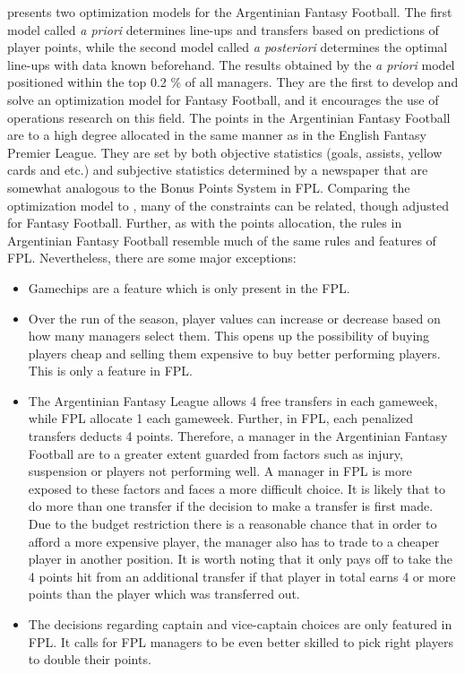 \newpar

\cite{Bonomo} presents two optimization models for the Argentinian Fantasy Football. The first model called \textit{a priori} determines line-ups and transfers based on predictions of player points, while the second model called \textit{a posteriori} determines the optimal line-ups with data known beforehand. The results obtained by the \textit{a priori} model positioned within the top 0.2 \% of all managers. They are the first to develop and solve an optimization model for Fantasy Football, and it encourages the use of operations research on this field. The points in the Argentinian Fantasy Football are to a high degree allocated in the same manner as in the English Fantasy Premier League. They are set by both objective statistics (goals, assists, yellow cards and etc.) and subjective statistics determined by a newspaper that are somewhat analogous to the Bonus Points System in FPL. Comparing the optimization model to \cite{Mathsports}, many of the constraints can be related, though adjusted for Fantasy Football. Further, as with the points allocation, the rules in Argentinian Fantasy Football resemble much of the same rules and features of FPL. Nevertheless, there are some major exceptions: 


\begin{itemize}
    \item Gamechips are a feature which is only present in the FPL.  
    \item Over the run of the season, player values can increase or decrease based on how many managers select them. This opens up the possibility of buying players cheap and selling them expensive to buy better performing players. This is only a feature in FPL.
    \item The Argentinian Fantasy League allows 4 free transfers in each gameweek, while FPL allocate 1 each gameweek. Further, in FPL, each penalized transfers deducts 4 points. Therefore, a manager in the Argentinian Fantasy Football are to a greater extent guarded from factors such as injury, suspension or players not performing well. A manager in FPL is more exposed to these factors and faces a more difficult choice. It is likely that to do more than one transfer if the decision to make a transfer is first made. Due to the budget restriction there is a reasonable chance that in order to afford a more expensive player, the manager also has to trade to a cheaper player in another position. It is worth noting that it only pays off to take the 4 points hit from an additional transfer if that player in total earns 4 or more points than the player which was transferred out. 
    \item The decisions regarding captain and vice-captain choices are only featured in FPL. It calls for FPL managers to be even better skilled to pick right players to double their points. 
\end{itemize}

